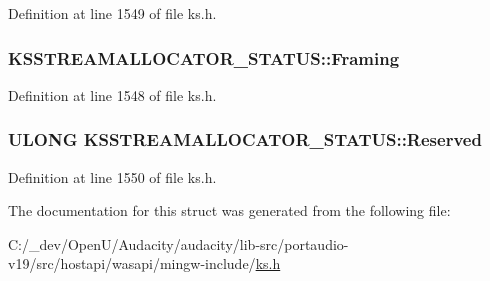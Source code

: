 Definition at line 1549 of file ks.\+h.

\subsubsection[{\texorpdfstring{Framing}{Framing}}]{ K\+S\+S\+T\+R\+E\+A\+M\+A\+L\+L\+O\+C\+A\+T\+O\+R\+\_\+\+S\+T\+A\+T\+U\+S\+::\+Framing}\hypertarget{struct_k_s_s_t_r_e_a_m_a_l_l_o_c_a_t_o_r___s_t_a_t_u_s_aec69a994d32bf64ab192e00ad824ab0b}{}\label{struct_k_s_s_t_r_e_a_m_a_l_l_o_c_a_t_o_r___s_t_a_t_u_s_aec69a994d32bf64ab192e00ad824ab0b}


Definition at line 1548 of file ks.\+h.

\subsubsection[{\texorpdfstring{Reserved}{Reserved}}]{\setlength{\rightskip}{0pt plus 5cm}U\+L\+O\+NG K\+S\+S\+T\+R\+E\+A\+M\+A\+L\+L\+O\+C\+A\+T\+O\+R\+\_\+\+S\+T\+A\+T\+U\+S\+::\+Reserved}\hypertarget{struct_k_s_s_t_r_e_a_m_a_l_l_o_c_a_t_o_r___s_t_a_t_u_s_a808a603d84c6a9df1778fffd3c7478f2}{}\label{struct_k_s_s_t_r_e_a_m_a_l_l_o_c_a_t_o_r___s_t_a_t_u_s_a808a603d84c6a9df1778fffd3c7478f2}


Definition at line 1550 of file ks.\+h.



The documentation for this struct was generated from the following file\+:\begin{DoxyCompactItemize}
\item 
C\+:/\+\_\+dev/\+Open\+U/\+Audacity/audacity/lib-\/src/portaudio-\/v19/src/hostapi/wasapi/mingw-\/include/\hyperlink{ks_8h}{ks.\+h}\end{DoxyCompactItemize}
